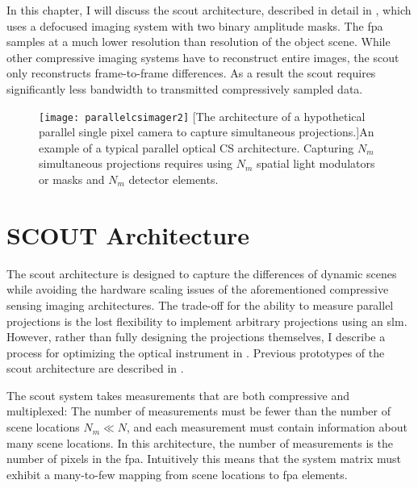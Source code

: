 In this chapter, I will discuss the \gls{scout} architecture, described in detail in , which uses a defocused imaging system with two binary amplitude masks. The \gls{fpa} samples at a much lower resolution than resolution of the object scene. While other compressive imaging systems have to reconstruct entire images, the \gls{scout} only reconstructs frame-to-frame differences. As a result the \gls{scout}  requires significantly less bandwidth to transmitted compressively sampled data. 

 

\begin{figure}
	\texttt{[image: parallelcsimager2]}
	[The architecture of a hypothetical parallel single pixel camera to capture simultaneous projections.]{An example of a typical parallel optical CS architecture. Capturing $N_m$ simultaneous projections requires using $N_m$ spatial light modulators or masks and $N_m$ detector elements.}
	\label{fig:parallelcsimager2}
\end{figure}




\section{SCOUT Architecture}\label{sec:ScoutArchitecture}


The \gls{scout} architecture is designed to capture the differences of dynamic scenes while avoiding the hardware scaling issues of the aforementioned \gls{compressive sensing} imaging architectures. The trade-off for the ability to measure parallel projections is the lost flexibility to implement arbitrary projections using an \gls{slm}. However, rather than fully designing the projections themselves, I describe a process for optimizing the optical instrument  in . Previous prototypes of the \gls{scout} architecture are described in \cite{stenner2010static, rivenson2010single}. 

The \gls{scout} system takes measurements that are both compressive and multiplexed: The number of measurements must be fewer than the number of scene locations $N_m \ll N$, and each measurement must contain information about many scene locations. In this architecture, the number of measurements is the number of pixels in the \gls{fpa}. Intuitively this means that the system matrix must exhibit a many-to-few mapping from scene locations to \gls{fpa} elements. 

